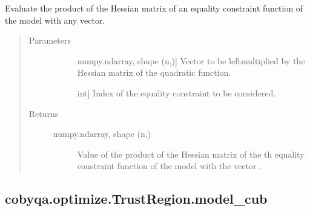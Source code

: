 \documentclass[letterpaper,10pt,english]{sphinxmanual}
\begin{document}
\begin{fulllineitems}
\begin{fulllineitems}
\label{\detokenize{refs/generated/cobyqa.optimize.TrustRegion.model_ceq_hessp:cobyqa.optimize.TrustRegion.model_ceq_hessp}}
\sphinxAtStartPar
Evaluate the product of the Hessian matrix of an equality constraint
function of the model with any vector.
\begin{quote}\begin{description}
\item[{Parameters}] \leavevmode\begin{description}
\item[{}] \leavevmode{[}numpy.ndarray, shape (n,){]}
\sphinxAtStartPar
Vector to be left\sphinxhyphen{}multiplied by the Hessian matrix of the quadratic
function.

\item[{}] \leavevmode{[}int{]}
\sphinxAtStartPar
Index of the equality constraint to be considered.

\end{description}

\item[{Returns}] \leavevmode\begin{description}
\item[{numpy.ndarray, shape (n,)}] \leavevmode
\sphinxAtStartPar
Value of the product of the Hessian matrix of the \sphinxhyphen{}th equality
constraint function of the model with the vector .

\end{description}

\end{description}\end{quote}

\end{fulllineitems}



\subsection{cobyqa.optimize.TrustRegion.model\_cub}
\label{\detokenize{refs/generated/cobyqa.optimize.TrustRegion.model_cub:cobyqa-optimize-trustregion-model-cub}}\label{\detokenize{refs/generated/cobyqa.optimize.TrustRegion.model_cub::doc}}


\end{fulllineitems}
\end{document}
